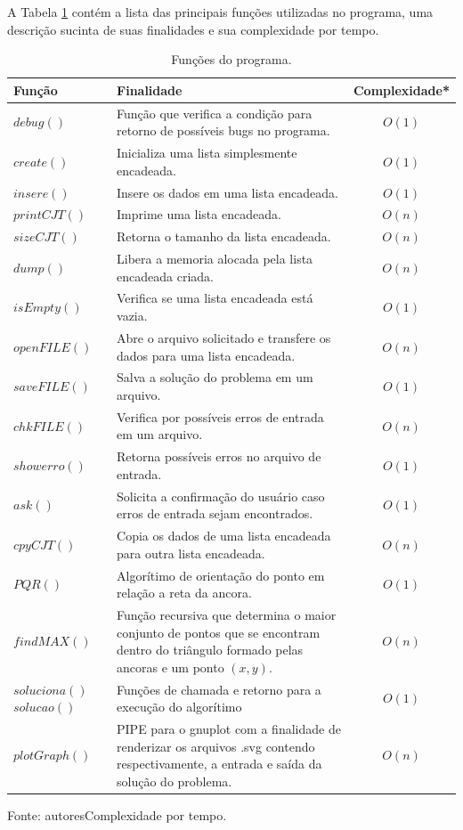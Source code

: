 \documentclass[12pt,a4paper]{article}
\begin{document}
A Tabela \ref{tab:funcoes} contém a lista das principais funções utilizadas no programa, uma descrição sucinta de suas finalidades e sua complexidade por tempo.

\pagebreak

\begin{table}[!htbp]
	\renewcommand{\arraystretch}{1.8}
	\caption{Funções do programa.}
	\label{tab:funcoes}
	\begin{tabular}{p{2.2cm} p{10cm} c}
		\toprule 
		Função & Finalidade & Complexidade* \\ 
		\midrule
		$debug()$ & Função que verifica a condição para retorno de possíveis bugs no programa. & $O(1)$ \\
		$create()$ & Inicializa uma lista simplesmente encadeada. & $O(1)$ \\
		$insere()$ & Insere os dados em uma lista encadeada. & $O(1)$ \\
		$printCJT()$ & Imprime uma lista encadeada. & $O(n)$ \\
		$sizeCJT()$ & Retorna o tamanho da lista encadeada. & $O(n)$ \\
		$dump()$ & Libera a memoria alocada pela lista encadeada criada. & $O(n)$ \\
		$isEmpty()$ & Verifica se uma lista encadeada está vazia. & $O(1)$ \\
		$openFILE()$ & Abre o arquivo solicitado e transfere os dados para uma lista encadeada. & $O(n)$ \\
		$saveFILE()$ & Salva a solução do problema em um arquivo. & $O(1)$ \\
		$chkFILE()$ & Verifica por possíveis erros de entrada em um arquivo. & $O(n)$ \\
		$showerro()$ & Retorna possíveis erros no arquivo de entrada. & $O(1)$ \\
		$ask()$ & Solicita a confirmação do usuário caso erros de entrada sejam encontrados. & $O(1)$ \\
		$cpyCJT()$ & Copia os dados de uma lista encadeada para outra lista encadeada. & $O(n)$ \\
		$PQR()$ & Algorítimo de orientação do ponto em relação a reta da ancora. & $O(1)$ \\
		$findMAX()$ & Função recursiva que determina o maior conjunto de pontos que se encontram dentro do triângulo formado pelas ancoras e um ponto $(x,y)$.  & $O(n)$ \\
		$soluciona()$ $solucao()$ & Funções de chamada e retorno para a execução do algorítimo & $O(1)$ \\
		$plotGraph()$ & PIPE para o gnuplot com a finalidade de renderizar os arquivos .svg contendo respectivamente, a entrada e saída da solução do problema.  & $O(n)$ \\ 
		\bottomrule
	\end{tabular}
	\footnotesize Fonte: autores\hfill *Complexidade por tempo.
\end{table}
\end{document}
